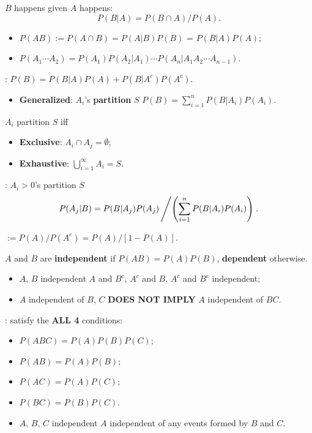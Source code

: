  \(B\) happens given \(A\) happens:
\[P(B|A) = {P(B\cap A)}/{P(A)}.\]
\begin{itemize}
  \item \(P(AB) := P(A\cap B) = P(A|B)P(B)\) = \(P(B|A)P(A)\);
  \item \(P(A_1\cdots A_2)=P(A_1)P(A_2|A_1)\cdots
    P(A_n|A_1A_2\cdots A_{n-1})\).
\end{itemize}

: \(P(B) = P(B|A)P(A) + P(B|A^c)P(A^c)\).
\begin{itemize}
  \item \textbf{Generalized}: \(A_i\)'s \textbf{partition} \(S\) \tf
    \(P(B) = \sum\limits_{i=1}^{n}P(B|A_i)P(A_i)\).
\end{itemize}
 \(A_i\) partition \(S\) iff
\begin{multicols}{2}
\begin{itemize}
  \item \textbf{Exclusive}: \(A_i\cap A_j = \emptyset\);
  \item \textbf{Exhaustive}: \(\bigcup\limits_{i=1}^{\infty}A_i =S\).
\end{itemize}
\end{multicols}

: \(A_i > 0\)'s partition \(S\) \tf 
\[P(A_j|B) =
{P(B|A_j)P(A_j)}\left/\left({\sum\limits_{i=1}^{n}P(B|A_i)P(A_i)}\right)\right..
\]

 \(:=P(A) / P(A^c) = P(A) / [1-P(A)]\).

 \(A\) and \(B\) are \textbf{independent} if
\(P(AB) = P(A)P(B)\), \textbf{dependent} otherwise.
\begin{itemize}
  \item \(A\), \(B\) independent \tf \(A\) and \(B^c\), \(A^c\) and \(B\),
    \(A^c\) and \(B^c\) independent;
  \item \(A\) independent of \(B\), \(C\) \textbf{DOES NOT IMPLY} \(A\)
    independent of \(BC\).
\end{itemize}

: satisfy the \textbf{ALL 4} conditions: 
\begin{multicols}{2}
\begin{itemize}
  \item \(P(ABC) = P(A)P(B)P(C)\);
  \item \(P(AB) = P(A)P(B)\);
  \item \(P(AC) = P(A)P(C)\);
  \item \(P(BC) = P(B)P(C)\).
\end{itemize}
\end{multicols}
\begin{itemize}
  \item \(A\), \(B\), \(C\) independent \tf \(A\) independent of any events
    formed by \(B\) and \(C\).
\end{itemize}

